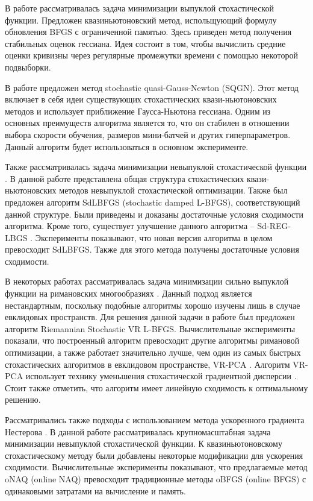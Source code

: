 \documentclass[]{scrartcl}
\begin{document}
В работе \cite{journals/siamjo/ByrdHNS16} рассматривалась задача минимизации выпуклой стохастической функции. Предложен квазиньютоновский метод, испольщующий формулу обновления BFGS с ограниченной памятью. Здесь приведен метод получения стабильных оценок гессиана. Идея состоит в том, чтобы вычислить средние оценки кривизны через регулярные промежутки времени с помощью некоторой подвыборки.

В работе \cite{journals/corr/abs-2004-03040} предложен метод stochastic quasi-Gauss-Newton (SQGN). Этот метод включает в себя идеи существующих стохастических квази-ньютоновских методов и использует приближение Гаусса-Ньютона гессиана. Одним из основных преимуществ алгоритма является то, что он стабилен в отношении выбора скорости обучения, размеров мини-батчей и других гиперпараметров. Данный алгоритм будет использоваться в основном эксперименте.


Также рассматривалась задача минимизации невыпуклой стохастической функции \cite{journals/siamjo/WangMGL17}. В данной работе представлена общая структура стохастических квази-ньютоновских методов невыпуклой стохастической оптимизации. Также был предложен алгоритм SdLBFGS (stochastic damped L-BFGS), соответствующий данной структуре. Были приведены и доказаны достаточные условия сходимости алгоритма. Кроме того, существует улучшение данного алгоритма -- Sd-REG-LBGS \cite{journals/corr/abs-1912-04456}. Эксперименты показывают, что новая версия алгоритма в целом превосходит SdLBFGS. Также для этого метода получены достаточные условия сходимости.

В некоторых работах рассматривалась задача минимизации сильно выпуклой функции на римановских многообразиях \cite{journals/corr/RoychowdhuryP17}. Данный подход является нестандартным, поскольку подобные алгоритмы хорошо изучены лишь в случае евклидовых пространств. Для решения данной задачи в работе был предложен алгоритм Riemannian Stochastic VR L-BFGS. Вычислительные эксперименты показали, что построенный алгоритм превосходит другие алгоритмы римановой оптимизации, а также работает значительно лучше, чем один из самых быстрых стохастических алгоритмов в евклидовом пространстве, VR-PCA \cite{journals/corr/Shamir14b}. Алгоритм VR-PCA использует технику уменьшения стохастической градиентной дисперсии \cite{oai:repository.ust.hk:1783.1-98257}.  Стоит также  отметить, что алгоритм имеет линейную сходимость к оптимальному решению. 

Рассматривались также подходы с использованием метода ускоренного градиента Нестерова \cite{journals/corr/abs-1909-03621}. В данной работе рассматривалась крупномасштабная задача минимизации невыпуклой стохастической функции. К квазиньютоновскому стохастическому методу были добавлены некоторые модификации для ускорения сходимости. Вычислительные эксперименты показывают, что предлагаемые метод oNAQ (online NAQ)  превосходит традиционные методы oBFGS (online BFGS) \cite{journals/jmlr/SchraudolphYG07} с одинаковыми затратами на вычисление и память.
\end{document}
